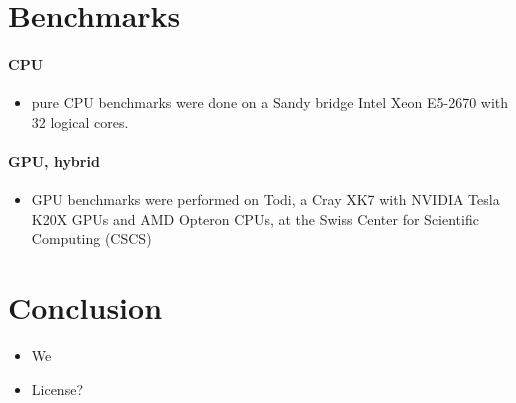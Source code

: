 \documentclass[oribibl]{llncs2e/llncs}
\begin{document}
\section{Benchmarks}
\paragraph{CPU}
\begin{itemize}
\item pure CPU benchmarks were done on a Sandy bridge Intel Xeon E5-2670 with 32 logical cores.
\end{itemize}
\paragraph{GPU, hybrid}
\begin{itemize}
\item GPU benchmarks were performed on Todi, a Cray XK7 with NVIDIA Tesla K20X GPUs and AMD Opteron CPUs, at the Swiss Center for Scientific Computing (CSCS)
\end{itemize}


\section{Conclusion}
\begin{itemize}
\item We 
\item License?
\end{itemize}



\end{document}
